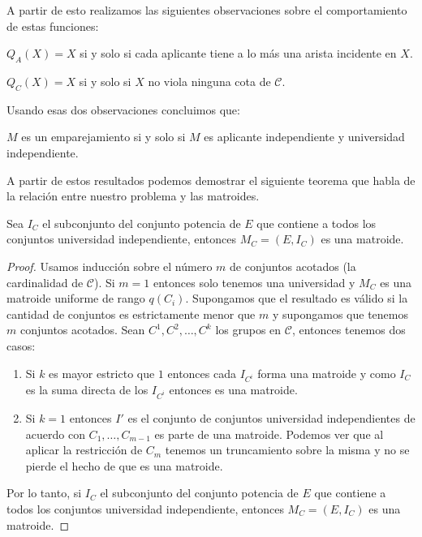 A partir de esto realizamos las siguientes observaciones sobre el comportamiento de estas funciones:

\begin{obs}
$Q_A(X)=X$ si y solo si cada aplicante tiene a lo más una arista incidente en $X$.
\end{obs}
\begin{obs}
$Q_C(X)=X$ si y solo si $X$ no viola ninguna cota de $\mathcal{C}$.
\end{obs}

Usando esas dos observaciones concluimos que:

\begin{obs}
$M$ es un emparejamiento si y solo si $M$ es aplicante independiente y universidad independiente. 
\end{obs}

A partir de estos resultados podemos demostrar el siguiente teorema que habla de la relación entre nuestro problema y las matroides. 

\begin{teo}
\label{matroid}
Sea $I_C$ el subconjunto del conjunto potencia de $E$ que contiene a todos los conjuntos universidad independiente, entonces $M_C = (E,I_C)$ es una matroide. 
\end{teo}

\begin{proof}
Usamos inducción sobre el número $m$ de conjuntos acotados (la cardinalidad de $\mathcal{C}$). Si $m=1$ entonces solo tenemos una universidad y $M_C$ es una matroide uniforme de rango $q(C_i)$. 
Supongamos que el resultado es válido si la cantidad de conjuntos es estrictamente menor que $m$ y supongamos que tenemos $m$ conjuntos acotados. Sean $C^1,C^2,\dots, C^k$ los grupos en $\mathcal{C}$, entonces tenemos dos casos:
\begin{enumerate}
\item Si $k$ es mayor estricto que $1$ entonces cada $I_{C^i}$ forma una matroide y como $I_C$ es la suma directa de los $I_{C^i}$ entonces es una matroide. 
\item Si $k=1$ entonces $I'$ es el conjunto de conjuntos universidad independientes de acuerdo con $C_1,\dots,C_{m-1}$ es parte de una matroide. Podemos ver que al aplicar la restricción de $C_m$ tenemos un truncamiento sobre la misma y no se pierde el hecho de que es una matroide. 
\end{enumerate}
Por lo tanto, si $I_C$ el subconjunto del conjunto potencia de $E$ que contiene a todos los conjuntos universidad independiente, entonces $M_C = (E,I_C)$ es una matroide.
\end{proof}

